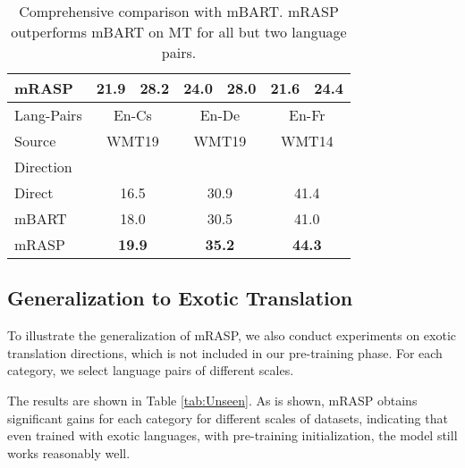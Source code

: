 \documentclass[11pt,a4paper]{article}
\newcommand{\mf}[1]{\multicolumn{2}{c}{ #1}}
\newcommand{\method}{mRASP\xspace}
\newcommand{\baseline}{Direct}
\begin{document}
\begin{table}[ht]
\begin{center}
{\begin{tabular}{lcccccc}
\\


 \method &
\textbf{21.9} & \textbf{28.2} &
 \textbf{24.0} &  28.0 &
 \textbf{21.6} & \textbf{24.4}

\\


\midrule
\midrule

Lang-Pairs & 

\mf{En-Cs} & 
\mf{En-De} &
\mf{En-Fr}


\\

Source & 
\mf{WMT19}   & 
\mf{WMT19}   & 
\mf{WMT14}  

\\


 Direction & 
 \mf{} & 

 \mf{} &


 \mf{} 
 
\\


\midrule

 \baseline &
\mf{16.5} & \mf{30.9} &  \mf{41.4}   

\\


mBART &
\mf{18.0}  &
\mf{30.5} & 
\mf{41.0}
 

\\


\method &
\mf{\textbf{19.9}} & 
\mf{\textbf{35.2}} &  
\mf{\textbf{44.3}}

\\


\bottomrule
\end{tabular}
}
\caption{Comprehensive comparison with mBART. \method  outperforms mBART on MT for all but two language pairs.}
\label{tab:cmp-mBART}
\end{center}
\end{table} 


\subsection{Generalization to Exotic Translation}

To illustrate the generalization of \method, we also conduct experiments on exotic translation directions, which is not included in our pre-training phase. 
For each category, we select language pairs of different scales.

The results are shown in Table \ref{tab:Unseen}. As is shown, \method obtains significant gains for each category for different scales of datasets, indicating that even trained with exotic languages, with pre-training initialization, the model still works reasonably well. 
\end{document}
